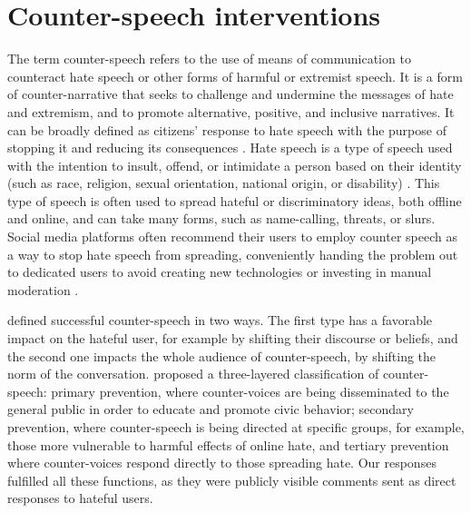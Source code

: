 \documentclass[preprint,12pt]{elsarticle}
\begin{document}
\tableofcontents













\section{Counter-speech interventions}

The term counter-speech refers to the use of means of communication to counteract hate speech or other forms of harmful or extremist speech. It is a form of counter-narrative that seeks to challenge and undermine the messages of hate and extremism, and to promote alternative, positive, and inclusive narratives. It can be broadly defined as citizens’ response to hate speech with the purpose of stopping it and reducing its consequences \citep{leader2016dangerous, garland2020countering}. Hate speech is a type of speech used with the intention to insult, offend, or intimidate a person based on their identity (such as race, religion, sexual orientation, national origin, or disability) \citep{dictionary2002merriam}. This type of speech is often used to spread hateful or discriminatory ideas, both offline and online, and can take many forms, such as name-calling, threats, or slurs. Social media platforms often recommend their users to employ counter speech as a way to stop hate speech from spreading, conveniently handing the problem out to dedicated users to avoid creating new technologies or investing in manual moderation \citep{schieb2016governing}. 

\citet{benesch2016considerations} defined successful counter-speech in two ways. The first type has a favorable impact on the hateful user, for example by shifting their discourse or beliefs, and the second one impacts the whole audience of counter-speech, by shifting the norm of the conversation.  \citep{rieger2018hate} proposed a three-layered classification of counter-speech: primary prevention, where counter-voices are being disseminated to the general public in order to educate and promote civic behavior; secondary prevention, where counter-speech is being directed at specific groups, for example, those more vulnerable to harmful effects of online hate, and tertiary prevention where counter-voices respond directly to those spreading hate. Our responses fulfilled all these functions, as they were publicly visible comments sent as direct responses to hateful users.
\end{document}

